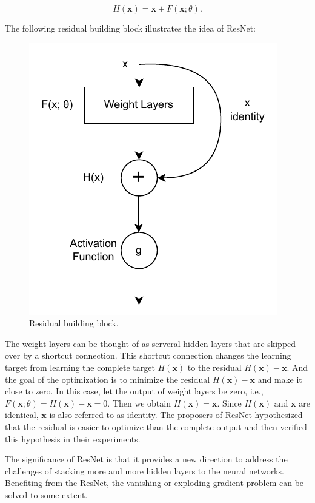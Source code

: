 \documentclass[
	parskip, 			   %
	twoside, 			   %
	DIV=14, 			   %
	BCOR=15.0mm, 		   %
	headsepline, 		   %
	open=right, 		   %
	captions=tableheading, %
	bibliography=totoc,    %
	numbers=noenddot       %
]{scrreprt}
\begin{document}
\begin{equation}
    \label{eq:ResNet}
    H(\mathbf{x})=\mathbf{x}+F(\mathbf{x};\theta).
\end{equation}

The following residual building block illustrates the idea of ResNet:

\clearpage
\begin{figure}[htbp!]
    \centering
    \includegraphics[scale=1]{figures/ResNet.pdf}
    \caption{Residual building block.}
    \label{fig:ResNet}
\end{figure}

The weight layers can be thought of as serveral hidden layers that are skipped over by a shortcut connection. This shortcut connection changes the learning target from learning the complete target $H(\mathbf{x})$ to the residual $H(\mathbf{x})-\mathbf{x}$. And the goal of the optimization is to minimize the residual $H(\mathbf{x})-\mathbf{x}$ and make it close to zero. In this case, let the output of weight layers be zero, i.e., $F(\mathbf{x};\theta)=H(\mathbf{x})-\mathbf{x}=0$. Then we obtain $H(\mathbf{x})=\mathbf{x}$. Since $H(\mathbf{x})$ and $\mathbf{x}$ are identical, $\mathbf{x}$ is also referred to as identity. The proposers of ResNet hypothesized that the residual is easier to optimize than the complete output and then verified this hypothesis in their experiments. 

 The significance of ResNet is that it provides a new direction to address the challenges of stacking more and more hidden layers to the neural networks. Benefiting from the ResNet, the vanishing or exploding gradient problem can be solved to some extent.
\end{document}
